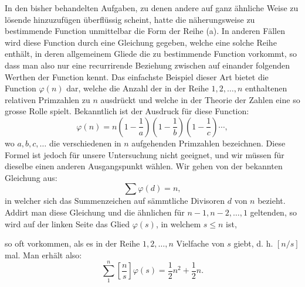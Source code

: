 \documentclass[11pt]{article}
\newcommand{\floor}[1]{\left[#1\right]}
\begin{document}
In den bisher behandelten Aufgaben, zu denen andere auf ganz ähnliche Weise zu lösende hinzuzufügen überflüssig scheint, hatte die näherungsweise zu bestimmende Function unmittelbar die Form der Reihe (a). In anderen Fällen wird diese Function durch eine Gleichung gegeben, welche eine solche Reihe enthält, in deren allgemeinem Gliede die zu bestimmende Function vorkommt, so dass man also nur eine recurrirende Beziehung zwischen auf einander folgenden Werthen der Function kennt. Das einfachste Beispiel dieser Art bietet die Function $\varphi(n)$ dar, welche die Anzahl der in der Reihe $1,2,\ldots,n$ enthaltenen relativen Primzahlen zu $n$ ausdrückt und welche in der Theorie der Zahlen eine so grosse Rolle spielt. Bekanntlich ist der Ausdruck für diese Function:
\[
 \varphi(n)=n\left(1-\frac1a\right)\left(1-\frac1b\right)\left(1-\frac1c\right)\cdots,
\]
wo $a,b,c,\ldots$ die verschiedenen in $n$ aufgehenden Primzahlen bezeichnen. Diese Formel ist jedoch für unsere Untersuchung nicht geeignet, und wir müssen für dieselbe einen anderen Ausgangspunkt wählen. Wir gehen von der bekannten Gleichung aus:
\[
 \sum \varphi(d)=n,
\]
in welcher sich das Summenzeichen auf sämmtliche Divisoren $d$ von $n$ bezieht. Addirt man diese Gleichung und die ähnlichen für $n-1,n-2,\ldots,1$ geltenden, so wird auf der linken Seite das Glied $\varphi(s)$, in welchem $s\leq n$ ist,

so oft vorkommen, als es in der Reihe $1,2,\ldots,n$ Vielfache von $s$ giebt, d. h. $\floor{n/s}$ mal. Man erhält also:
\[
 \sum_{1}^{n}\floor{\frac ns}\varphi(s)=\frac12 n^2+\frac12 n.
\]
\end{document}
